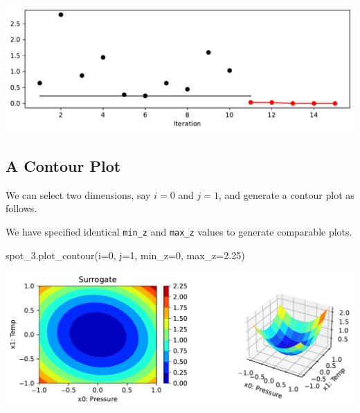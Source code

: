 \documentclass[
  letterpaper,
  DIV=11,
  numbers=noendperiod]{scrreprt}
\newenvironment{Shaded}{\begin{snugshade}}{\end{snugshade}}
\newcommand{\DecValTok}[1]{\textcolor[rgb]{0.68,0.00,0.00}{#1}}
\newcommand{\FloatTok}[1]{\textcolor[rgb]{0.68,0.00,0.00}{#1}}
\newcommand{\NormalTok}[1]{\textcolor[rgb]{0.00,0.23,0.31}{#1}}
\newcommand{\OperatorTok}[1]{\textcolor[rgb]{0.37,0.37,0.37}{#1}}
\begin{document}
\includegraphics{008_num_spot_multidim_files/figure-pdf/cell-6-output-1.pdf}

\subsection{A Contour Plot}\label{a-contour-plot}

We can select two dimensions, say \(i=0\) and \(j=1\), and generate a
contour plot as follows.

\begin{tcolorbox}[enhanced jigsaw, coltitle=black, bottomrule=.15mm, breakable, toprule=.15mm, colframe=quarto-callout-note-color-frame, title=\textcolor{quarto-callout-note-color}{\faInfo}\hspace{0.5em}{Note:}, colbacktitle=quarto-callout-note-color!10!white, opacityback=0, left=2mm, leftrule=.75mm, colback=white, rightrule=.15mm, bottomtitle=1mm, toptitle=1mm, titlerule=0mm, arc=.35mm, opacitybacktitle=0.6]

We have specified identical \texttt{min\_z} and \texttt{max\_z} values
to generate comparable plots.

\end{tcolorbox}

\begin{Shaded}
\begin{Highlighting}[]
\NormalTok{spot\_3.plot\_contour(i}\OperatorTok{=}\DecValTok{0}\NormalTok{, j}\OperatorTok{=}\DecValTok{1}\NormalTok{, min\_z}\OperatorTok{=}\DecValTok{0}\NormalTok{, max\_z}\OperatorTok{=}\FloatTok{2.25}\NormalTok{)}
\end{Highlighting}
\end{Shaded}

\includegraphics{008_num_spot_multidim_files/figure-pdf/cell-7-output-1.pdf}
\end{document}
